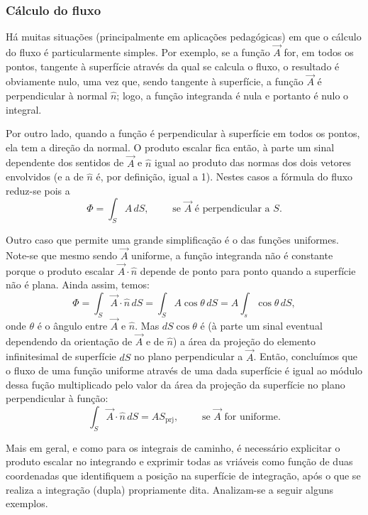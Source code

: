 \subsubsection*{Cálculo do fluxo}
Há muitas situações (principalmente em aplicações pedagógicas) em que o cálculo
do fluxo é particularmente simples. Por exemplo, se a função $\vec A$ for, em
todos os pontos, tangente à superfície através da qual se calcula o fluxo, o
resultado é obviamente nulo, uma vez que, sendo tangente à superfície, a função
$\vec A$ é perpendicular à normal $\hat n$; logo, a função integranda é nula e
portanto é nulo o integral.

Por outro lado, quando a função é perpendicular à superfície em todos os pontos,
ela tem a direção da normal. O produto escalar fica então, à parte um sinal
dependente dos sentidos de $\vec A$ e $\hat n$ igual ao produto das
normas dos dois vetores envolvidos (e a de $\hat n$ é, por definição, igual a
1). Nestes casos a fórmula do fluxo reduz-se pois a 
\begin{equation*}
\Phi = \int_S A\,dS,\qquad\text{ se $\vec A$ é perpendicular a $S$.}
\end{equation*}

Outro caso que permite uma grande simplificação é o das funções uniformes.
Note-se que mesmo sendo $\vec A$ uniforme, a função integranda não é constante
porque o produto escalar $\vec A\cdot \hat n$ depende de ponto para ponto quando
a superfície não é plana. Ainda assim, temos:
\begin{equation*}
\Phi=\int_S\vec A\cdot\hat n\,dS=\int_S A\cos\theta\,dS=A\int_s\cos\theta\,dS,
\end{equation*}
onde $\theta$ é o ângulo entre $\vec A$ e $\hat n$. Mas $dS \cos\theta$ é (à
parte um sinal eventual dependendo da orientação de $\vec A$ e de $\hat n$) a área
da projeção do elemento infinitesimal de superfície $dS$ no plano perpendicular
a $\vec A$. Então, concluímos que o fluxo de uma função uniforme através de uma
dada superfície é igual ao módulo dessa fução multiplicado pelo valor da área da
projeção da superfície no plano perpendicular à função:
\begin{equation*}
\int_S\vec A\cdot\hat n\,dS= AS_{\text{prj}},\qquad\text{ se $\vec A$ for
uniforme.}
\end{equation*}

Mais em geral, e como para os integrais de caminho, é necessário explicitar o
produto escalar no integrando e exprimir todas as vriáveis como função de duas 
coordenadas que identifiquem a posição na superfície de integração, após o que
se realiza a integração (dupla) propriamente dita. Analizam-se a seguir alguns
exemplos.

